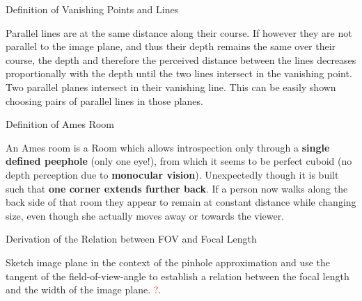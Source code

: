 \documentclass[10pt,a4paper]{scrartcl}
\begin{document}
\begin{multicols*}{2}
\begin{QandA}{Definition of Vanishing Points and Lines}
\item Parallel lines are at the same distance along their course. If however they are not parallel to the image plane, and thus their depth remains the same over their course, the depth and therefore the perceived distance between the lines decreases proportionally with the depth until the two lines intersect in the vanishing point. Two parallel planes intersect in their vanishing line. This can be easily shown choosing pairs of parallel lines in those planes.
\end{QandA}

\begin{QandA}{Definition of Ames Room}
\item An Ames room is a Room which allows introspection only through a \textbf{single defined peephole} (only one eye!), from which it seems to be perfect cuboid (no depth perception due to \textbf{monocular vision}). Unexpectedly though it is built such that \textbf{one corner extends further back}. If a person now walks along the back side of that room they appear to remain at constant distance while changing size, even though she actually moves away or towards the viewer. 
\end{QandA}

\begin{QandA}{Derivation of the Relation between FOV and Focal Length}
\item Sketch image plane in the context of the pinhole approximation and use the tangent of the field-of-view-angle to establish a relation between the focal length and the width of the image plane. \textcolor{red}{?}.
\end{QandA}


\end{multicols*}
\end{document}
